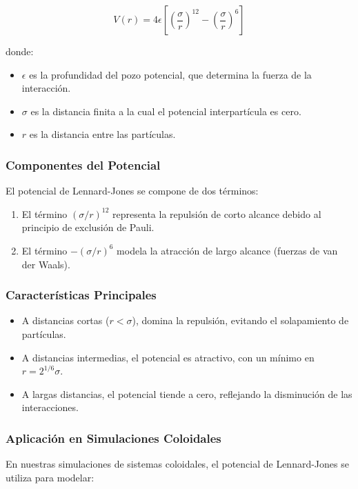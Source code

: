 \documentclass[twocolumn]{article}
\begin{document}
\begin{equation}
    V(r) = 4\epsilon \left[ \left(\frac{\sigma}{r}\right)^{12} - \left(\frac{\sigma}{r}\right)^{6} \right]
\end{equation}

donde:
\begin{itemize}
    \item $\epsilon$ es la profundidad del pozo potencial, que determina la fuerza de la interacción.
    \item $\sigma$ es la distancia finita a la cual el potencial interpartícula es cero.
    \item $r$ es la distancia entre las partículas.
\end{itemize}

\subsubsection*{Componentes del Potencial}
El potencial de Lennard-Jones se compone de dos términos:

\begin{enumerate}
    \item El término $(\sigma/r)^{12}$ representa la repulsión de corto alcance debido al principio de exclusión de Pauli.
    \item El término $-(\sigma/r)^{6}$ modela la atracción de largo alcance (fuerzas de van der Waals).
\end{enumerate}

\subsubsection*{Características Principales}
\begin{itemize}
    \item A distancias cortas ($r < \sigma$), domina la repulsión, evitando el solapamiento de partículas.
    \item A distancias intermedias, el potencial es atractivo, con un mínimo en $r = 2^{1/6}\sigma$.
    \item A largas distancias, el potencial tiende a cero, reflejando la disminución de las interacciones.
\end{itemize}

\subsubsection*{Aplicación en Simulaciones Coloidales}
En nuestras simulaciones de sistemas coloidales, el potencial de Lennard-Jones se utiliza para modelar:
\end{document}

